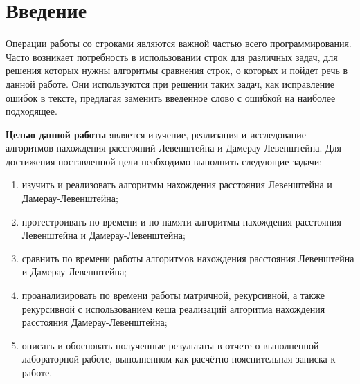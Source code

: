 \chapter*{Введение}

Операции работы со строками являются важной частью всего программирования. Часто возникает потребность в использовании строк для различных задач, для решения которых нужны алгоритмы сравнения строк, о которых и пойдет речь в данной работе.
Они используются при решении таких задач, как исправление ошибок в тексте, предлагая заменить введенное слово с ошибкой на наиболее подходящее.



\textbf{Целью данной работы} является изучение, реализация и исследование алгоритмов нахождения расстояний Левенштейна и Дамерау-Левенштейна.
Для достижения поставленной цели необходимо выполнить следующие задачи:
\begin{enumerate}[label=\arabic*)]
	\item изучить и реализовать алгоритмы нахождения расстояния Левенштейна и Дамерау-Левенштейна;
    \item протестроивать по времени и по памяти алгоритмы нахождения расстояния Левенштейна и Дамерау-Левенштейна;
    \item сравнить по времени работы алгоритмов нахождения расстояния Левенштейна и Дамерау-Левенштейна;
    \item проанализировать по времени работы матричной, рекурсивной, а также рекурсивной с использованием кеша реализаций алгоритма нахождения расстояния Дамерау-Левенштейна;
	\item описать и обосновать полученные результаты в отчете о выполненной лабораторной работе, выполненном как расчётно-пояснительная записка к работе.
\end{enumerate}
